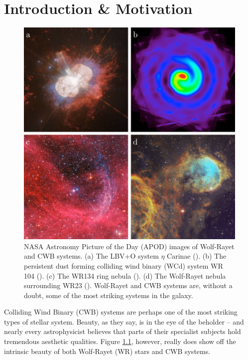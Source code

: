 \chapter{Introduction \& Motivation}

\begin{figure}[H]
  \centering
  \includegraphics[width=5in]{assets/wolf-rayets/wolf-rayets.png}
  \caption[NASA APOD images of Wolf-Rayet and CWB systems]{NASA Astronomy Picture of the Day (APOD) images of Wolf-Rayet and CWB systems. (a) The LBV+O system $\eta$ Carinae (). (b) The persistent dust forming colliding wind binary (WCd) system WR 104 (). (c) The WR134 ring nebula (). (d) The Wolf-Rayet nebula surrounding WR23 (). Wolf-Rayet and CWB systems are, without a doubt, some of the most striking systems in the galaxy.}
  \label{fig:cwbexamples}
\end{figure}

Colliding Wind Binary (CWB) systems are perhaps one of the most striking types of stellar system.
Beauty, as they say, is in the eye of the beholder -- and nearly every astrophysicist believes that parts of their specialist subjects hold tremendous aesthetic qualities.
Figure \ref{fig:cwbexamples}, however, really does show off the intrinsic beauty of both Wolf-Rayet (WR) stars and CWB systems.

